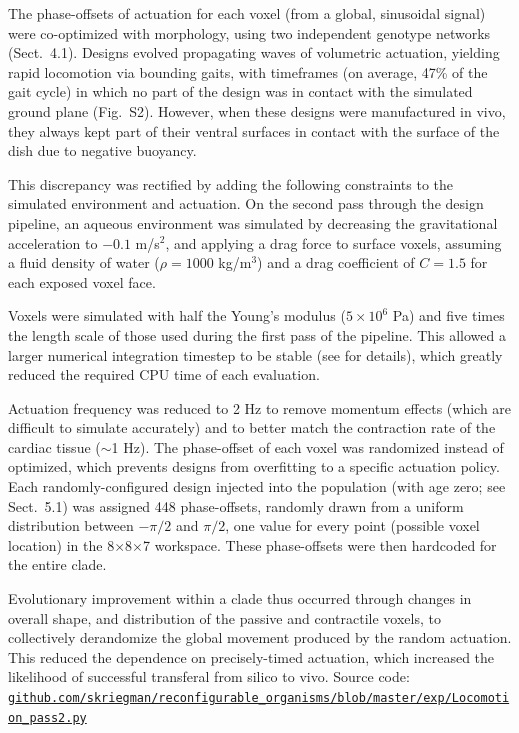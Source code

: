The phase-offsets of actuation for each voxel (from a global, sinusoidal signal) were co-optimized with morphology, using two independent genotype networks (Sect.~4.1). 
Designs evolved propagating waves of volumetric actuation, yielding rapid locomotion via bounding gaits, with timeframes (on average, 47\% of the gait cycle) in which no part of the design was in contact with the simulated ground plane (Fig.~S2). 
However, when these designs were manufactured in vivo, they always kept part of their ventral surfaces in contact with the surface of the dish due to negative buoyancy. 

This discrepancy was rectified by adding the following constraints to the simulated environment and actuation. 
On the second pass through the design pipeline, an aqueous environment was simulated by decreasing the gravitational acceleration to $-0.1$ m/s$^2$, and applying a drag force to surface voxels, assuming a fluid density of water ($\rho=1000$ kg/m$^3$) and a drag coefficient of $C=1.5$ for each exposed voxel face. 

Voxels were simulated with half the Young's modulus ($5\times10^6$ Pa) and five times the length scale of those used during the first pass of the pipeline. 
This allowed a larger numerical integration timestep to be stable (see \cite{hiller2014dynamic} for details), which greatly reduced the required CPU time of each evaluation. 

Actuation frequency was reduced to 2 Hz to remove momentum effects (which are difficult to simulate accurately) and to better match the contraction rate of the cardiac tissue ($\sim$1 Hz). 
The phase-offset of each voxel was randomized instead of optimized, which prevents designs from overfitting to a specific actuation policy. 
Each randomly-configured design injected into the population (with age zero; see Sect.~5.1) was assigned 448 phase-offsets, randomly drawn from a uniform distribution between {$-\pi/2$} and {$\pi/2$}, one value for every point (possible voxel location) in the 8{$\times$}8{$\times$}7 workspace. 
These phase-offsets were then hardcoded for the entire clade.

Evolutionary improvement within a clade thus occurred through changes in overall shape, and distribution of the passive and contractile voxels, to collectively derandomize the global movement produced by the random actuation. 
This reduced the dependence on precisely-timed actuation, which increased the likelihood of successful transferal from silico to vivo. 
Source code: \\
\href{https://github.com/skriegman/reconfigurable_organisms/blob/master/exp/Locomotion_pass2.py}{\scriptsize\tt\color{blue}github.com/skriegman/reconfigurable\_organisms/blob/master/exp/Locomotion\_pass2.py}

